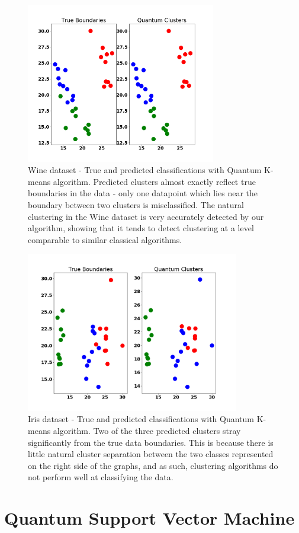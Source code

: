 \documentclass[twocolumn, english]{revtex4-2}
\begin{document}
\begin{figure}
\includegraphics[height=7cm]{Figure_Wine1}
\caption{Wine dataset - True and predicted classifications with Quantum K-means algorithm. Predicted clusters almost exactly reflect true boundaries in the data - only one datapoint which lies near the boundary between two clusters is misclassified. The natural clustering in the Wine dataset is very accurately detected by our algorithm, showing that it tends to detect clustering at a level comparable to similar classical algorithms.}
\end{figure}

\begin{figure}
\includegraphics[height=7cm]{Figure_Iris1}
\caption{Iris dataset - True and predicted classifications with Quantum K-means algorithm. Two of the three predicted clusters stray significantly from the true data boundaries. This is because there is little natural cluster separation between the two classes represented on the right side of the graphs, and as such, clustering algorithms do not perform well at classifying the data.}
\end{figure}

\section{Quantum Support Vector Machine}
\end{document}

